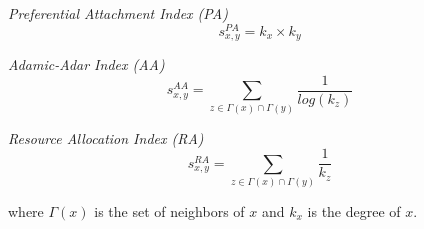 \noindent
\textit{Preferential Attachment Index (PA)}
\begin{equation}
\label{eqn:pa}
s^{PA}_{x,y}= k_{x} \times k_{y}
\end{equation}

\noindent
\textit{Adamic-Adar Index (AA)}
\begin{equation}
\label{eqn:adamic-adar}
s^{AA}_{x,y}=
\sum\limits_{z\in \Gamma(x) \cap \Gamma(y)}\frac{1}{log(k_{z})}
\end{equation}

\noindent
\textit{Resource Allocation Index (RA)}
\begin{equation}
\label{eqn:resource-allocation}
s^{RA}_{x,y}=
\sum\limits_{z\in \Gamma(x) \cap \Gamma(y)}\frac{1}{k_{z}}
\end{equation}


where $\Gamma(x)$ is the set of neighbors of $x$ and $k_{x}$ is the degree of $x$.
